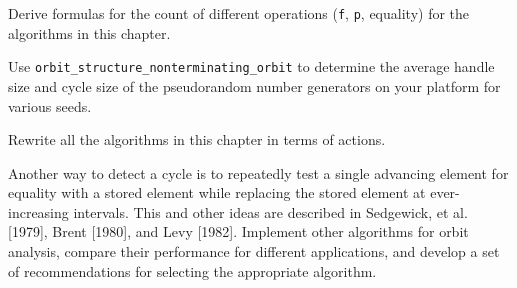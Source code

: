 \begin{exercise}
	Derive formulas for the count of different operations (\verb|f|, \verb|p|, equality) for
	the algorithms in this chapter.
\end{exercise}

\begin{exercise}
	Use \verb|orbit_structure_nonterminating_orbit| to determine the average handle size and
	cycle size of the pseudorandom number generators on your platform for various seeds.
\end{exercise}

\begin{exercise}
	Rewrite all the algorithms in this chapter in terms of actions.
\end{exercise}

\begin{project}
	Another way to detect a cycle is to repeatedly test a single advancing element for
	equality with a stored element while replacing the stored element at ever-increasing
	intervals. This and other ideas are described in Sedgewick, et al. [1979], Brent [1980],
	and Levy [1982]. Implement other algorithms for orbit analysis, compare their
	performance for different applications, and develop a set of recommendations for
	selecting the appropriate algorithm.
\end{project}
